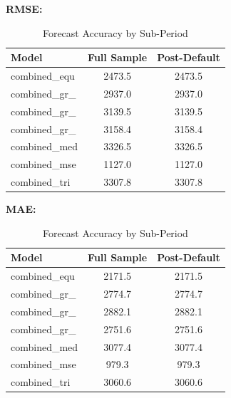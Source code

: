 \begin{table}[htbp]
\centering
\footnotesize
\caption{Forecast Accuracy by Sub-Period}
\label{tab:period_metrics}
\textbf{RMSE:}
\begin{tabular}{lcc}
\toprule
Model & Full Sample & Post-Default \\
\midrule
combined_equ & 2473.5 & 2473.5 \\
combined_gr_ & 2937.0 & 2937.0 \\
combined_gr_ & 3139.5 & 3139.5 \\
combined_gr_ & 3158.4 & 3158.4 \\
combined_med & 3326.5 & 3326.5 \\
combined_mse & 1127.0 & 1127.0 \\
combined_tri & 3307.8 & 3307.8 \\
\bottomrule
\end{tabular}

\vspace{0.3cm}
\textbf{MAE:}
\begin{tabular}{lcc}
\toprule
Model & Full Sample & Post-Default \\
\midrule
combined_equ & 2171.5 & 2171.5 \\
combined_gr_ & 2774.7 & 2774.7 \\
combined_gr_ & 2882.1 & 2882.1 \\
combined_gr_ & 2751.6 & 2751.6 \\
combined_med & 3077.4 & 3077.4 \\
combined_mse & 979.3 & 979.3 \\
combined_tri & 3060.6 & 3060.6 \\
\bottomrule
\end{tabular}

\vspace{0.3cm}
\end{table}